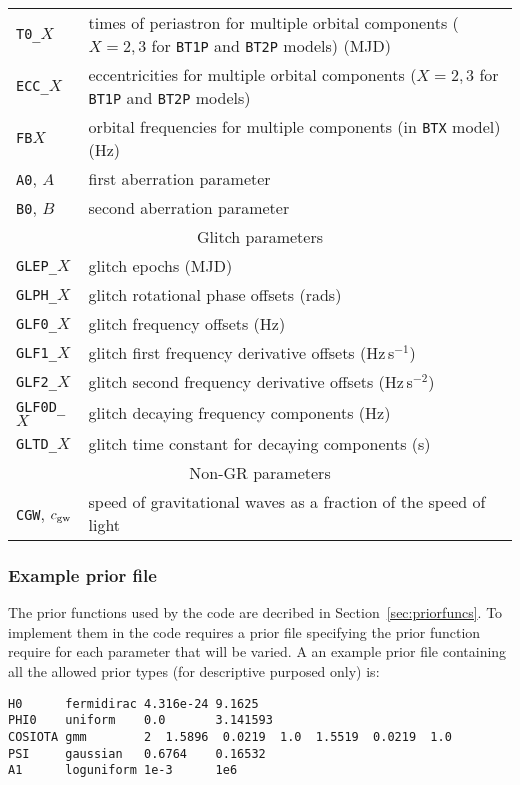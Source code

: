 \begin{longtable}{l|l}
{\tt T0\_}$X$ & times of periastron for multiple orbital components ($X=2,3$ for {\tt BT1P} and {\tt BT2P} models) (MJD) \\
{\tt ECC\_}$X$ & eccentricities for multiple orbital components ($X=2,3$ for {\tt BT1P} and {\tt BT2P} models) \\
{\tt FB}$X$ & orbital frequencies for multiple components (in {\tt BTX} model) (Hz) \\
{\tt A0}, $A$ & first aberration parameter \citep[see e.g.\ Section~2.7.3 of][]{2006MNRAS.372.1549E} \\
{\tt B0}, $B$ & second aberration parameter \citep[see e.g.\ Section~2.7.3 of][]{2006MNRAS.372.1549E} \\
\hline
\multicolumn{2}{c}{Glitch parameters \citep[see][]{2006MNRAS.369..655H,2013MNRAS.429..688Y}} \\
\hline
{\tt GLEP\_}$X$ & glitch epochs (MJD) \\
{\tt GLPH\_}$X$ & glitch rotational phase offsets (rads) \\
{\tt GLF0\_}$X$ & glitch frequency offsets (Hz) \\
{\tt GLF1\_}$X$ & glitch first frequency derivative offsets (Hz\,s$^{-1}$) \\
{\tt GLF2\_}$X$ & glitch second  frequency derivative offsets (Hz\,s$^{-2}$) \\
{\tt GLF0D\_}$X$ & glitch decaying frequency components (Hz) \\
{\tt GLTD\_}$X$ & glitch time constant for decaying components (s) \\
\hline
\multicolumn{2}{c}{Non-GR parameters} \\
\hline
{\tt CGW}, $c_{\rm gw}$ & speed of gravitational waves as a fraction of the speed of light \\
\hline

\hline
\end{longtable}


\subsubsection{Example prior file}

The prior functions used by the code are decribed in Section~\ref{sec:priorfuncs}. To implement them in the code requires a prior
file specifying the prior function require for each parameter that will be varied. A an example prior file containing all the
allowed prior types (for descriptive purposed only) is:
\begin{verbatim}
H0      fermidirac 4.316e-24 9.1625
PHI0    uniform    0.0       3.141593
COSIOTA gmm        2  1.5896  0.0219  1.0  1.5519  0.0219  1.0
PSI     gaussian   0.6764    0.16532
A1      loguniform 1e-3      1e6
\end{verbatim}

